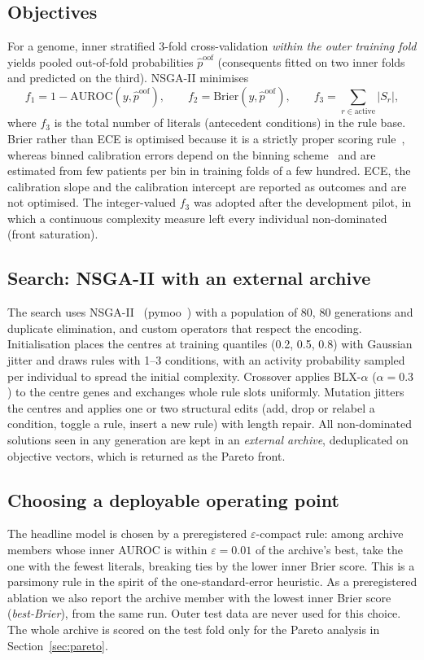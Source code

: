 \subsection{Objectives}
For a genome, inner stratified 3-fold cross-validation \emph{within the outer training
fold} yields pooled out-of-fold probabilities $\hat p^{\text{oof}}$ (consequents
fitted on two inner folds and predicted on the third). NSGA-II minimises
\begin{equation}
f_1 = 1-\mathrm{AUROC}(y,\hat p^{\text{oof}}),\qquad
f_2 = \mathrm{Brier}(y,\hat p^{\text{oof}}),\qquad
f_3 = \sum_{r\in\text{active}} |S_r| ,
\label{eq:objectives}
\end{equation}
where $f_3$ is the total number of literals (antecedent conditions) in the rule base.
Brier rather than ECE is optimised because it is a strictly proper scoring
rule~\cite{gneiting2007}, whereas binned calibration errors depend on the binning
scheme~\cite{nixon2019} and are estimated from few patients per bin in training folds of
a few hundred. ECE, the calibration slope and the calibration
intercept are reported as outcomes and are not optimised. The integer-valued $f_3$ was
adopted after the development pilot, in which a continuous complexity measure left
every individual non-dominated (front saturation).

\subsection{Search: NSGA-II with an external archive}
The search uses NSGA-II~\cite{deb2002} (pymoo~\cite{blank2020}) with a population of 80,
80 generations and duplicate elimination, and custom operators that respect the
encoding. Initialisation places the centres at training quantiles (0.2, 0.5, 0.8) with
Gaussian jitter and draws rules with 1--3 conditions, with an activity probability
sampled per individual to spread the initial complexity. Crossover applies BLX-$\alpha$
($\alpha=0.3$) to the centre genes and exchanges whole rule slots uniformly.
Mutation jitters the centres and applies one or two structural edits (add, drop or
relabel a condition, toggle a rule, insert a new rule) with length repair. All
non-dominated solutions seen in any generation are kept in an \emph{external archive},
deduplicated on objective vectors, which is returned as the Pareto front.

\subsection{Choosing a deployable operating point}
The headline model is chosen by a preregistered $\varepsilon$-compact rule: among
archive members whose inner AUROC is within $\varepsilon=0.01$ of the archive's best,
take the one with the fewest literals, breaking ties by the lower inner Brier score.
This is a parsimony rule in the spirit of the one-standard-error heuristic. As a
preregistered ablation we also report the archive member with the lowest inner Brier
score (\emph{best-Brier}), from the same run. Outer test data are never used for
this choice. The whole archive is scored on the test fold only for the Pareto analysis
in Section~\ref{sec:pareto}.
